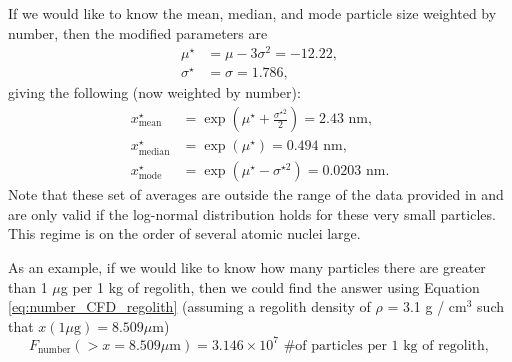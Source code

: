 \documentclass{hitec}
\numberwithin{equation}{section}
\begin{document}
If we would like to know the mean, median, and mode particle size weighted by number, then the modified parameters are
\begin{align}
	\mu^\star &= \mu - 3\sigma^2 = -12.22,\\
	\sigma^\star &= \sigma = 1.786,
\end{align}
giving the following (now weighted by number):
\begin{align}
	x^\star_{\text{mean}} &= \exp\left(\mu^\star + \frac{\sigma^{\star 2}}{2}\right) = 2.43 \text{ nm},\\
	x^\star_{\text{median}} &= \exp(\mu^\star) = 0.494 \text{ nm},\\
	x^\star_{\text{mode}} &=  \exp\left(\mu^\star - \sigma^{\star 2}\right) = 0.0203 \text{ nm}.
\end{align}
Note that these set of averages are outside the range of the data provided in \cite{carrier2003particle} and are only valid if the log-normal distribution holds for these very small particles. This regime is on the order of several atomic nuclei large.


As an example, if we would like to know how many particles there are greater than 1 $\mu$g per 1 kg of regolith, then we could find the answer using Equation \eqref{eq:number_CFD_regolith} (assuming a regolith density of $\rho$ = 3.1 g / cm$^3$ such that $x(1 \mu\text{g}) = 8.509 \mu\text{m}$)
\begin{equation}
	F_{\text{number}}(> x = 8.509 \mu\text{m}) = 3.146\times 10^{7} \text{ \# of particles per 1 kg of regolith},
\end{equation}


\end{document}
